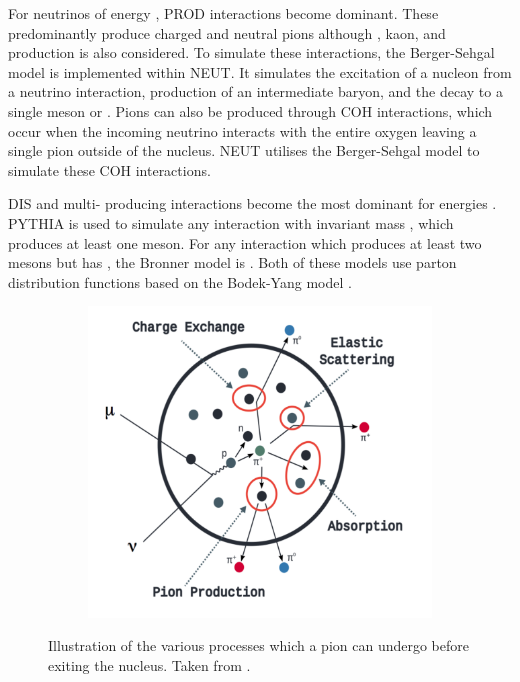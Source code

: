 For neutrinos of energy , PROD interactions become dominant. These predominantly produce charged and neutral pions although \quickmath{\gamma}, kaon, and \quickmath{\eta} production is also considered. To simulate these interactions, the Berger-Sehgal \cite{PhysRevD.76.113004} model is implemented within NEUT. It simulates the excitation of a nucleon from a neutrino interaction, production of an intermediate baryon, and the   decay to a single meson or \quickmath{\gamma}. Pions can also be produced through COH interactions, which occur when the incoming neutrino interacts with the entire oxygen   leaving a single pion outside of the nucleus. NEUT utilises the Berger-Sehgal \cite{Berger_Sehgal_coh} model to simulate these COH interactions.

DIS and multi-\quickmath{\pi} producing interactions become the most dominant for energies . PYTHIA \cite{Sjstrand1994} is used to simulate any interaction with invariant mass , which produces at least one meson. For any interaction which produces at least two mesons but has , the Bronner model is   \cite{Bronner2016}. Both of these models use parton distribution functions based on the Bodek-Yang model \cite{Gl_ck_1998,10.48550/arxiv.1011.6592,10.48550/arxiv.1012.0261}. 

\begin{figure}[h]
  \begin{subfigure}[t]{0.8\textwidth}
    \includegraphics[width=\textwidth, trim={0mm 0mm 0mm 0mm}, clip,page=1]{Figures/Simulations/FSIDiagram.pdf}
  \end{subfigure}
  \caption{Illustration of the various processes which a pion can undergo before exiting the nucleus. Taken from \cite{10.48550/arxiv.1602.05299}.}
  \label{fig:Simulations_FSIDiagram}
\end{figure}

